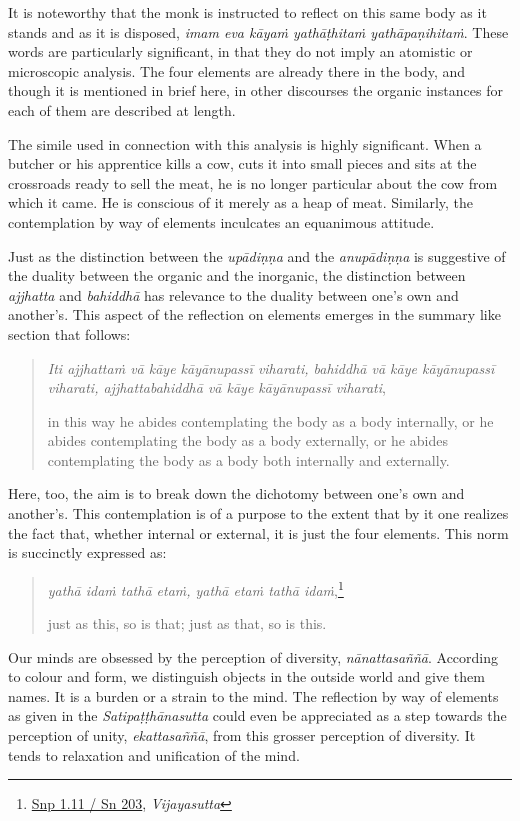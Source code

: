 It is noteworthy that the monk is instructed to reflect on this same body as it stands and as it is disposed, \emph{imam eva kāyaṁ yathāṭhitaṁ yathāpaṇihitaṁ}. These words are particularly significant, in that they do not imply an atomistic or microscopic analysis. The four elements are already there in the body, and though it is mentioned in brief here, in other discourses the organic instances for each of them are described at length.

The simile used in connection with this analysis is highly significant. When a butcher or his apprentice kills a cow, cuts it into small pieces and sits at the crossroads ready to sell the meat, he is no longer particular about the cow from which it came. He is conscious of it merely as a heap of meat. Similarly, the contemplation by way of elements inculcates an equanimous attitude.

\clearpage

Just as the distinction between the \emph{upādiṇṇa} and the \emph{anupādiṇṇa} is suggestive of the duality between the organic and the inorganic, the distinction between \emph{ajjhatta} and \emph{bahiddhā} has relevance to the duality between one's own and another's. This aspect of the reflection on elements emerges in the summary like section that follows:

\begin{quote}
\emph{Iti ajjhattaṁ vā kāye kāyānupassī viharati, bahiddhā vā kāye kāyānupassī viharati, ajjhattabahiddhā vā kāye kāyānupassī viharati},

in this way he abides contemplating the body as a body internally, or he abides contemplating the body as a body externally, or he abides contemplating the body as a body both internally and externally.
\end{quote}

Here, too, the aim is to break down the dichotomy between one's own and another's. This contemplation is of a purpose to the extent that by it one realizes the fact that, whether internal or external, it is just the four elements. This norm is succinctly expressed as:

\begin{quote}
\emph{yathā idaṁ tathā etaṁ, yathā etaṁ tathā idaṁ},\footnote{\href{https://suttacentral.net/snp1.11/pli/ms}{Snp 1.11 / Sn 203}, \emph{Vijayasutta}}

just as this, so is that; just as that, so is this.
\end{quote}

Our minds are obsessed by the perception of diversity, \emph{nānattasaññā}. According to colour and form, we distinguish objects in the outside world and give them names. It is a burden or a strain to the mind. The reflection by way of elements as given in the \emph{Satipaṭṭhānasutta} could even be appreciated as a step towards the perception of unity, \emph{ekattasaññā}, from this grosser perception of diversity. It tends to relaxation and unification of the mind.

